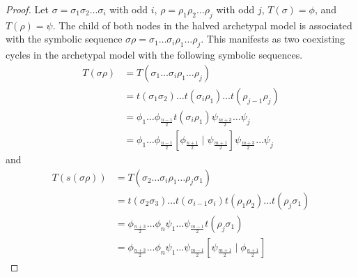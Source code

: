 \begin{proof}
	Let $\sigma = \sigma_1\sigma_2 \dots \sigma_i$ with odd $i$, $\rho = \rho_1\rho_2 \dots \rho_j$ with odd $j$, $T(\sigma) = \phi$, and $T(\rho) = \psi$.
	The child of both nodes in the halved archetypal model is associated with the symbolic sequence $\sigma\rho = \sigma_1 \dots \sigma_i \rho_1 \dots \rho_j$.
	This manifests as two coexisting cycles in the archetypal model with the following symbolic sequences.
	\begin{align*}
		T(\sigma\rho) & = T(\sigma_1 \dots \sigma_i \rho_1 \dots \rho_j)                                                                                  \\
		              & = t(\sigma_1\sigma_2) \dots t(\sigma_i\rho_1) \dots t(\rho_{j-1}\rho_j)                                                           \\
		              & = \phi_1 \dots \phi_{\frac{n-1}{2}} t(\sigma_i\rho_1) \psi_{\frac{m+3}{2}} \dots \psi_j                                           \\
		              & = \phi_1 \dots \phi_{\frac{n-1}{2}} \left[\phi_{\frac{n+1}{2}} \mid \psi_{\frac{m+1}{2}}\right] \psi_{\frac{m+3}{2}} \dots \psi_j
	\end{align*}
	and
	\begin{align*}
		T(s(\sigma\rho)) & = T(\sigma_2 \dots \sigma_i \rho_1 \dots \rho_j \sigma_1)                                                                         \\
		                 & = t(\sigma_2\sigma_3) \dots t(\sigma_{i-1}\sigma_i) t(\rho_1\rho_2) \dots t(\rho_j\sigma_1)                                       \\
		                 & = \phi_{\frac{n+3}{2}} \dots \phi_n \psi_1 \dots \psi_{\frac{m-1}{2}} t(\rho_j\sigma_1)                                           \\
		                 & = \phi_{\frac{n+3}{2}} \dots \phi_n \psi_1 \dots \psi_{\frac{m-1}{2}} \left[\psi_{\frac{m+1}{2}} \mid \phi_{\frac{n+1}{2}}\right]
	\end{align*}
\end{proof}

